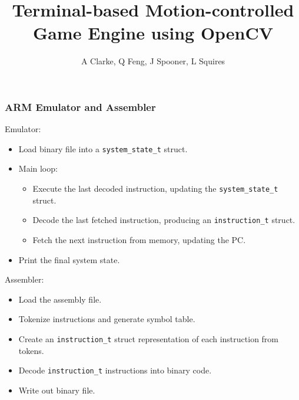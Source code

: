 \documentclass{beamer}
\title{Terminal-based Motion-controlled Game Engine using OpenCV}
\author{A Clarke, Q Feng, J Spooner, L Squires}
\begin{document}
	
\frame{\titlepage}

\begin{frame}
	\frametitle{ARM Emulator and Assembler}
	Emulator:
	\begin{itemize}
		\item Load binary file into a \texttt{system\_state\_t} struct.
		\item Main loop:
		\begin{itemize}
			\item Execute the last decoded instruction, updating the \texttt{system\_state\_t} struct.
			\item Decode the last fetched instruction, producing an \texttt{instruction\_t} struct.
			\item Fetch the next instruction from memory, updating the PC.
		\end{itemize}
		\item Print the final system state.
	\end{itemize}
	Assembler:
	\begin{itemize}
		\item Load the assembly file.
		\item Tokenize instructions and generate symbol table.
		\item Create an \texttt{instruction\_t} struct representation of each instruction from tokens.
		\item Decode \texttt{instruction\_t} instructions into binary code.
		\item Write out binary file.
	\end{itemize}
\end{frame}
\end{document}
